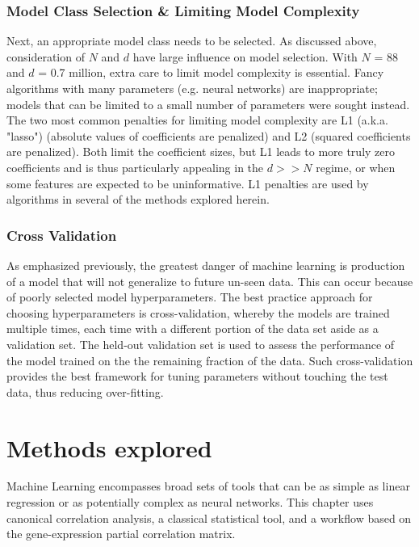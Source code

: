 \subsubsection{Model Class Selection \& Limiting Model Complexity}
Next, an appropriate model class needs to be selected.
As discussed above, consideration of $N$ and $d$ have large influence on model selection.
With $N$ = 88 and $d$ = 0.7 million, extra care to limit model complexity is essential.
Fancy algorithms with many parameters (e.g. neural networks) are inappropriate; models that can be limited to a small number of parameters were sought instead.
The two most common penalties for limiting model complexity are L1 (a.k.a. "lasso") \cite{tibshirani1996} (absolute values of coefficients are penalized) and L2 \cite{hoerl1970} (squared coefficients are penalized).
Both limit the coefficient sizes, but L1 leads to more truly zero coefficients \cite{tibshirani1996} and is thus particularly appealing in the $d >> N$ regime, or when some features are expected to be uninformative.
L1 penalties are used by algorithms in several of the methods explored herein.

\subsubsection{Cross Validation} %
As emphasized previously, the greatest danger of machine learning is production of a model that will not generalize to future un-seen data.
This can occur because of poorly selected model hyperparameters.
The best practice approach for choosing hyperparameters is cross-validation, whereby the models are trained multiple times, each time with a different portion of the data set aside as a validation set.
The held-out validation set is used to assess the performance of the model trained on the the remaining fraction of the data.
Such cross-validation provides the best framework for tuning parameters without touching the test data, thus reducing over-fitting.

\section{Methods explored}
Machine Learning encompasses broad sets of tools that can be as simple as linear regression or as potentially complex as neural networks.
This chapter uses canonical correlation analysis, a classical statistical tool, and a workflow based on the gene-expression partial correlation matrix.

